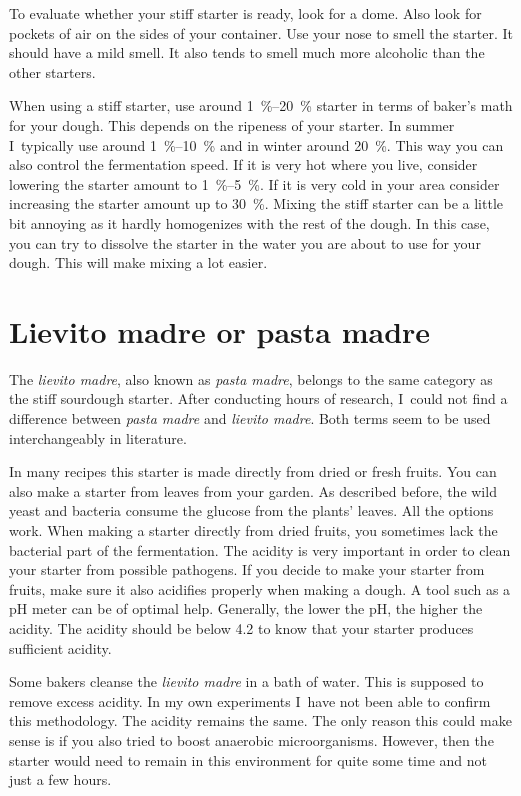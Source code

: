To evaluate whether your stiff starter is ready, look for a dome. Also look for
pockets of air on the sides of your container. Use your nose to smell the
starter. It should have a mild smell. It also tends to smell much more
alcoholic than the other starters.

When using a stiff starter, use around \qtyrange{1}{20}{\percent} starter in terms of
baker's math for your
dough. This depends on the ripeness of your starter.
In summer I~typically use around
\qtyrange{1}{10}{\percent} and in winter around \qty{20}{\percent}. This way you can
also control the fermentation speed. If it is very hot where you live, consider
lowering the starter amount to \qtyrange{1}{5}{\percent}. If it is very cold in your
area consider increasing the starter amount up to \qty{30}{\percent}.
Mixing the stiff starter can be a little bit annoying as it hardly homogenizes with
the rest of the dough. In this case, you can try to dissolve the starter in the
water you are about to use for your dough. This will make mixing a lot easier.


\section{Lievito madre or pasta madre}

The \emph{lievito madre}, also known as \emph{pasta madre}, belongs to the
same category as the stiff sourdough starter. After conducting hours of
research, I~could not find a difference between \emph{pasta madre} and
\emph{lievito madre}. Both terms seem to be used interchangeably in
literature.

In many recipes this starter is made directly
from dried or fresh fruits. You can also make a starter from leaves from your
garden. As described before, the wild yeast and bacteria consume the glucose
from the plants' leaves. All the options work. When making a starter directly
from dried fruits, you sometimes lack the bacterial part of the fermentation.
The acidity is very important in order to clean your starter from possible
pathogens. If you decide to make your starter from fruits, make sure it also
acidifies properly when making a dough. A tool such as a pH meter can be of
optimal help. Generally, the lower the pH, the higher the acidity. The acidity
should be below 4.2 to know that your starter produces sufficient acidity.

Some bakers cleanse the \emph{lievito madre} in a bath of water. This is supposed to
remove excess acidity. In my own experiments I~have not been able to confirm
this methodology. The acidity remains the same. The only reason this could
make sense is if you also tried to boost anaerobic microorganisms. However, then the
starter would need to remain in this environment for quite some time and not just
a few hours.


